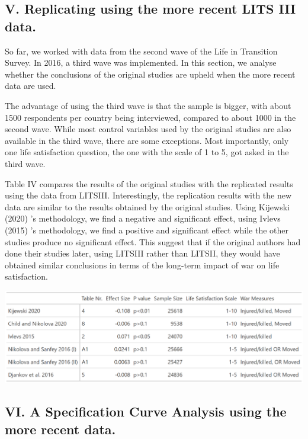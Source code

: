 \documentclass[
  letterpaper,
  DIV=11,
  numbers=noendperiod]{scrartcl}
\begin{document}
\hypertarget{v.-replicating-using-the-more-recent-lits-iii-data.}{%
\subsection{V. Replicating using the more recent LITS III
data.}\label{v.-replicating-using-the-more-recent-lits-iii-data.}}

So far, we worked with data from the second wave of the Life in
Transition Survey. In 2016, a third wave was implemented. In this
section, we analyse whether the conclusions of the original studies are
upheld when the more recent data are used.

The advantage of using the third wave is that the sample is bigger, with
about 1500 respondents per country being interviewed, compared to about
1000 in the second wave. While most control variables used by the
original studies are also available in the third wave, there are some
exceptions. Most importantly, only one life satisfaction question, the
one with the scale of 1 to 5, got asked in the third wave.

Table IV compares the results of the original studies with the
replicated results using the data from LITSIII. Interestingly, the
replication results with the new data are similar to the results
obtained by the original studies. Using Kijewski (2020) 's methodology,
we find a negative and significant effect, using Ivlevs (2015) 's
methodology, we find a positive and significant effect while the other
studies produce no significant effect. This suggest that if the original
authors had done their studies later, using LITSIII rather than LITSII,
they would have obtained similar conclusions in terms of the long-term
impact of war on life satisfaction.

\includegraphics{tab_1.png}

\hypertarget{vi.-a-specification-curve-analysis-using-the-more-recent-data.}{%
\subsection{VI. A Specification Curve Analysis using the more recent
data.}\label{vi.-a-specification-curve-analysis-using-the-more-recent-data.}}
\end{document}
